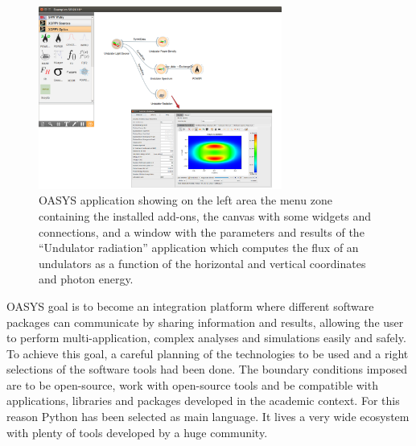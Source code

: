 \documentclass{aip-cp}
\begin{document}
\begin{figure}[h]
\includegraphics[width=8cm]{FIGURES/canvas.png}
\caption{OASYS application showing on the left area the menu zone containing the installed add-ons, the canvas with some widgets and connections, and a window with the parameters and results of the ``Undulator radiation'' application which computes the flux of an undulators as a function of the horizontal and vertical coordinates and photon energy.}
\label{figCanvas}
\end{figure}

OASYS goal is to become an integration platform where different software packages can communicate by sharing information and results, allowing the user to perform multi-application, complex analyses and simulations easily and safely. To achieve this goal, a careful planning of the technologies to be used and a right selections of the software tools had been done. The boundary conditions imposed are to be open-source, work with open-source tools and be compatible with applications, libraries and packages developed in the academic context. For this reason Python has been selected as main language. It lives a very wide ecosystem with plenty of tools developed by a huge community. 
\end{document}

